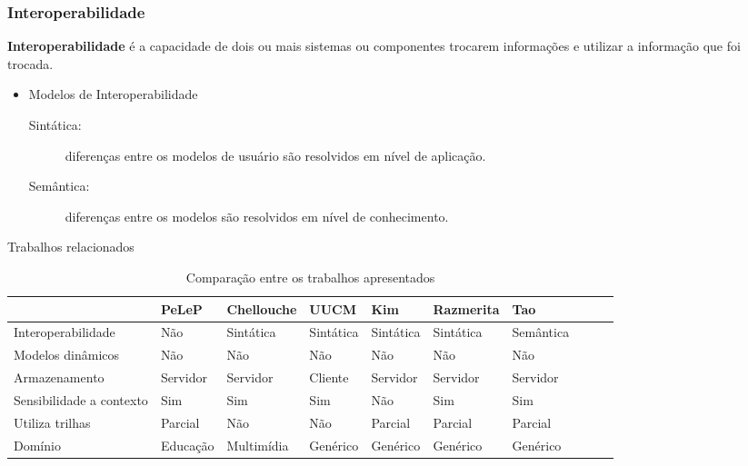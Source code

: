 \documentclass[14pt]{beamer}
\begin{document}

\begin{frame}
  \frametitle{Interoperabilidade}
  \textbf{Interoperabilidade} é a capacidade de dois ou mais sistemas ou componentes trocarem informações e utilizar a informação que foi trocada.
  \begin{itemize}
    \item Modelos de Interoperabilidade
    \begin{description}
      \item[Sintática:] diferenças entre os modelos de usuário são resolvidos em nível de aplicação.
      \item[Semântica:] diferenças entre os modelos são resolvidos em nível de conhecimento.
    \end{description}
  \end{itemize}
\end{frame}
    

\begin{frame}{Trabalhos relacionados}

	\begin{table}\centering\fontsize{7}{13}\selectfont
  \begin{tabular*}{1\textwidth}{@{}llllllllll@{}}
    \toprule
    			      & PeLeP    & Chellouche & UUCM      & Kim       & Razmerita & Tao \\
    \midrule
    Interoperabilidade        & Não      & Sintática  & Sintática & Sintática & Sintática & Semântica \\
    Modelos dinâmicos         & Não      & Não        & Não       & Não       & Não       & Não \\
    Armazenamento             & Servidor & Servidor   & Cliente   & Servidor  & Servidor  & Servidor \\
    Sensibilidade a contexto  & Sim      & Sim        & Sim       & Não       & Sim & Sim \\
    Utiliza trilhas           & Parcial  & Não        & Não       & Parcial   & Parcial   & Parcial \\
    Domínio                   & Educação & Multimídia & Genérico  & Genérico  & Genérico  & Genérico \\
    \bottomrule
  \end{tabular*}
  \caption{Comparação entre os trabalhos apresentados}
  \label{tab:comparacao}
\end{table}

\end{frame}
\end{document}
